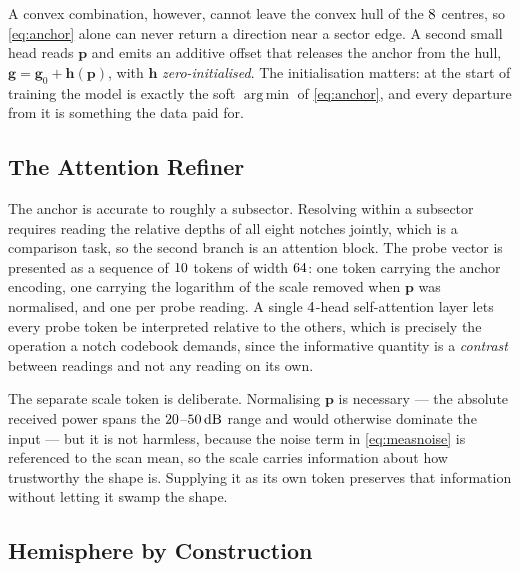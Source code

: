 \documentclass[journal]{IEEEtran}
\newcommand{\pv}{\mathbf{p}}
\newcommand{\dB}{\,\mathrm{dB}}
\DeclareMathOperator*{\argmin}{arg\,min}
\begin{document}
A convex combination, however, cannot leave the convex hull of the
$8$ centres, so \eqref{eq:anchor} alone can never return a direction
near a sector edge. A second small head reads $\pv$ and emits an additive
offset that releases the anchor from the hull,
$\mathbf{g} = \mathbf{g}_0 + \mathbf{h}(\pv)$, with $\mathbf{h}$
\emph{zero-initialised}. The initialisation matters: at the start of training
the model is exactly the soft $\argmin$ of \eqref{eq:anchor}, and every
departure from it is something the data paid for.

\subsection{The Attention Refiner}
\label{sec:arch:attn}

The anchor is accurate to roughly a subsector. Resolving within a subsector
requires reading the relative depths of all eight notches jointly, which is a
comparison task, so the second branch is an attention block. The probe vector
is presented as a sequence of $10$ tokens of width $64$: one
token carrying the anchor encoding, one carrying the logarithm of the scale
removed when $\pv$ was normalised, and one per probe reading. A single
$4$-head self-attention layer lets every probe token be interpreted
relative to the others, which is precisely the operation a notch codebook
demands, since the informative quantity is a \emph{contrast} between readings
and not any reading on its own.

The separate scale token is deliberate. Normalising $\pv$ is necessary --- the
absolute received power spans the $20$--$\jnrHi\dB$ range and would
otherwise dominate the input --- but it is not harmless, because the noise
term in \eqref{eq:measnoise} is referenced to the scan mean, so the scale
carries information about how trustworthy the shape is. Supplying it as its
own token preserves that information without letting it swamp the shape.

\subsection{Hemisphere by Construction}
\label{sec:arch:constraint}
\end{document}
